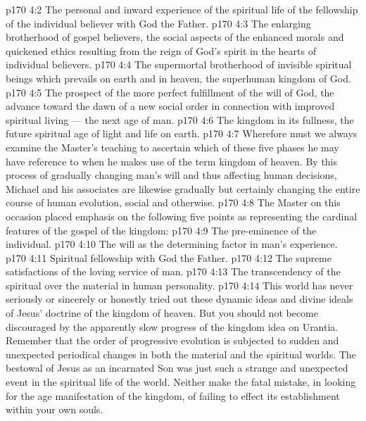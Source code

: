 \vs p170 4:2 \bibnobreakspace The personal and inward experience of the spiritual life of the fellowship of the individual believer with God the Father.
\vs p170 4:3 \pc {}\bibnobreakspace The enlarging brotherhood of gospel believers, the social aspects of the enhanced morals and quickened ethics resulting from the reign of God’s spirit in the hearts of individual believers.
\vs p170 4:4 \pc {}\bibnobreakspace The supermortal brotherhood of invisible spiritual beings which prevails on earth and in heaven, the superhuman kingdom of God.
\vs p170 4:5 \pc {}\bibnobreakspace The prospect of the more perfect fulfillment of the will of God, the advance toward the dawn of a new social order in connection with improved spiritual living --- the next age of man.
\vs p170 4:6 \pc {}\bibnobreakspace The kingdom in its fullness, the future spiritual age of light and life on earth.
\vs p170 4:7 \pc Wherefore must we always examine the Master’s teaching to ascertain which of these five phases he may have reference to when he makes use of the term kingdom of heaven. By this process of gradually changing man’s will and thus affecting human decisions, Michael and his associates are likewise gradually but certainly changing the entire course of human evolution, social and otherwise.
\vs p170 4:8 The Master on this occasion placed emphasis on the following five points as representing the cardinal features of the gospel of the kingdom:
\vs p170 4:9 \bibnobreakspace The pre\hyp{}eminence of the individual.
\vs p170 4:10 \bibnobreakspace The will as the determining factor in man’s experience.
\vs p170 4:11 \bibnobreakspace Spiritual fellowship with God the Father.
\vs p170 4:12 \bibnobreakspace The supreme satisfactions of the loving service of man.
\vs p170 4:13 \bibnobreakspace The transcendency of the spiritual over the material in human personality.
\vs p170 4:14 \pc This world has never seriously or sincerely or honestly tried out these dynamic ideas and divine ideals of Jesus’ doctrine of the kingdom of heaven. But you should not become discouraged by the apparently slow progress of the kingdom idea on Urantia. Remember that the order of progressive evolution is subjected to sudden and unexpected periodical changes in both the material and the spiritual worlds. The bestowal of Jesus as an incarnated Son was just such a strange and unexpected event in the spiritual life of the world. Neither make the fatal mistake, in looking for the age manifestation of the kingdom, of failing to effect its establishment within your own souls.
